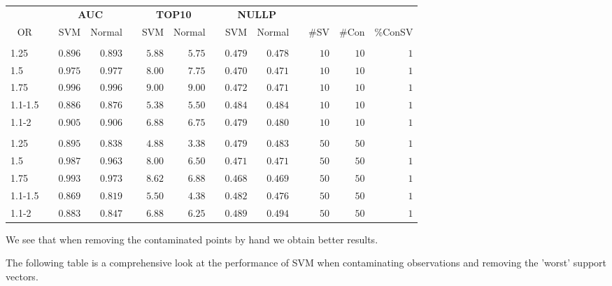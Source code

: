 \documentclass{article}\usepackage[]{graphicx}\usepackage[]{color}
\begin{document}
\begin{table}[H]
\begin{center}
\begin{tabular}{lcrrcrrcrrcrrr}
\hline\hline
\multicolumn{1}{c}{\bfseries }&\multicolumn{1}{c}{\bfseries }&\multicolumn{2}{c}{\bfseries AUC}&\multicolumn{1}{c}{\bfseries }&\multicolumn{2}{c}{\bfseries TOP10}&\multicolumn{1}{c}{\bfseries }&\multicolumn{2}{c}{\bfseries NULLP}&\multicolumn{1}{c}{\bfseries }&\multicolumn{3}{c}{\bfseries }\tabularnewline
\cline{1-14}
\multicolumn{1}{c}{OR}&\multicolumn{1}{c}{}&\multicolumn{1}{c}{SVM}&\multicolumn{1}{c}{Normal}&\multicolumn{1}{c}{}&\multicolumn{1}{c}{SVM}&\multicolumn{1}{c}{Normal}&\multicolumn{1}{c}{}&\multicolumn{1}{c}{SVM}&\multicolumn{1}{c}{Normal}&\multicolumn{1}{c}{}&\multicolumn{1}{c}{\#SV}&\multicolumn{1}{c}{\#Con}&\multicolumn{1}{c}{\%ConSV}\tabularnewline
\hline
&&&&&&&&&&&&&\tabularnewline
1.25&&$0.896$&$0.893$&&$5.88$&$5.75$&&$0.479$&$0.478$&&$10$&$10$&$1$\tabularnewline
1.5&&$0.975$&$0.977$&&$8.00$&$7.75$&&$0.470$&$0.471$&&$10$&$10$&$1$\tabularnewline
1.75&&$0.996$&$0.996$&&$9.00$&$9.00$&&$0.472$&$0.471$&&$10$&$10$&$1$\tabularnewline
1.1-1.5&&$0.886$&$0.876$&&$5.38$&$5.50$&&$0.484$&$0.484$&&$10$&$10$&$1$\tabularnewline
1.1-2&&$0.905$&$0.906$&&$6.88$&$6.75$&&$0.479$&$0.480$&&$10$&$10$&$1$\tabularnewline
\hline
&&&&&&&&&&&&&\tabularnewline
1.25&&$0.895$&$0.838$&&$4.88$&$3.38$&&$0.479$&$0.483$&&$50$&$50$&$1$\tabularnewline
1.5&&$0.987$&$0.963$&&$8.00$&$6.50$&&$0.471$&$0.471$&&$50$&$50$&$1$\tabularnewline
1.75&&$0.993$&$0.973$&&$8.62$&$6.88$&&$0.468$&$0.469$&&$50$&$50$&$1$\tabularnewline
1.1-1.5&&$0.869$&$0.819$&&$5.50$&$4.38$&&$0.482$&$0.476$&&$50$&$50$&$1$\tabularnewline
1.1-2&&$0.883$&$0.847$&&$6.88$&$6.25$&&$0.489$&$0.494$&&$50$&$50$&$1$\tabularnewline
\hline
\end{tabular}
\end{center}
\end{table}




We see that when removing the contaminated points by hand we obtain better results.

The following table is a comprehensive look at the performance of SVM when contaminating observations and removing the 'worst' support vectors.
\end{document}
